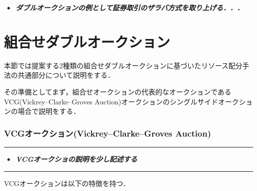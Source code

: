 \begin{itemize}
\tightlist
\item
  \textbf{\emph{ダブルオークションの例として証券取引のザラバ方式を取り上げる．．．}}
\end{itemize}

\hypertarget{ux7d44ux5408ux305bux30c0ux30d6ux30ebux30aaux30fcux30afux30b7ux30e7ux30f3}{%
\section{組合せダブルオークション}\label{ux7d44ux5408ux305bux30c0ux30d6ux30ebux30aaux30fcux30afux30b7ux30e7ux30f3}}

本節では提案する2種類の組合せダブルオークションに基づいたリソース配分手法の共通部分について説明をする．

その準備としてまず，組合せオークションの代表的なオークションであるVCG(Vickrey--Clarke--Groves
Auction)オークションのシングルサイドオークションの場合で説明をする．

\hypertarget{vcgux30aaux30fcux30afux30b7ux30e7ux30f3vickreyclarkegroves-auction}{%
\subsubsection{VCGオークション(Vickrey--Clarke--Groves
Auction)}\label{vcgux30aaux30fcux30afux30b7ux30e7ux30f3vickreyclarkegroves-auction}}

\begin{center}\rule{0.5\linewidth}{0.5pt}\end{center}

\begin{itemize}
\tightlist
\item
  \textbf{\emph{VCGオークショの説明を少し記述する}}
\end{itemize}

\begin{center}\rule{0.5\linewidth}{0.5pt}\end{center}

VCGオークションは以下の特徴を持つ．

